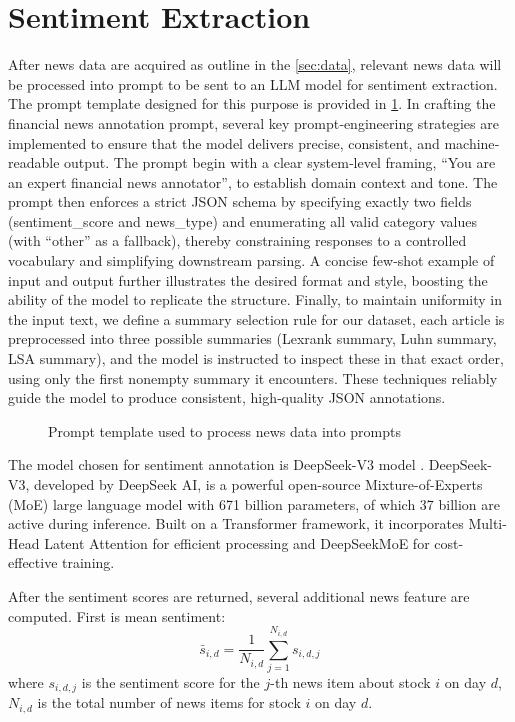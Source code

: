 \section{Sentiment Extraction}
After news data are acquired as outline in the \ref{sec:data}, relevant news data will be processed into prompt to be sent to an \gls{LLM} model for sentiment extraction. The prompt template designed for this purpose is provided in \ref{fig:prompt}. In crafting the financial news annotation prompt, several key prompt‐engineering strategies are implemented to ensure that the model delivers precise, consistent, and machine‐readable output. The prompt begin with a clear system‐level framing, “You are an expert financial news annotator”, to establish domain context and tone. The prompt then enforces a strict JSON schema by specifying exactly two fields (sentiment\_score and news\_type) and enumerating all valid category values (with “other” as a fallback), thereby constraining responses to a controlled vocabulary and simplifying downstream parsing. A concise few‐shot example of input and output further illustrates the desired format and style, boosting the ability of the model to replicate the structure. Finally, to maintain uniformity in the input text, we define a summary selection rule for our dataset, each article is preprocessed into three possible summaries (Lexrank summary, Luhn summary, \gls{LSA} summary), and the model is instructed to inspect these in that exact order, using only the first nonempty summary it encounters. These techniques reliably guide the model to produce consistent, high‐quality JSON annotations.

\begin{figure}
  \centering
  
  \caption{Prompt template used to process news data into prompts}
  \label{fig:prompt}
\end{figure}

The model chosen for sentiment annotation is DeepSeek-V3 model \cite{DeepSeekV3}. DeepSeek-V3, developed by DeepSeek AI, is a powerful open-source Mixture-of-Experts (MoE) large language model with 671 billion parameters, of which 37 billion are active during inference. Built on a Transformer framework, it incorporates Multi-Head Latent Attention for efficient processing and DeepSeekMoE for cost-effective training.

After the sentiment scores are returned, several additional news feature are computed. First is mean sentiment:
\[\bar{s}_{i,d}  = \frac{1}{N_{i,d}} \sum_{j=1}^{N_{i,d}} s_{i,d,j}\]
where \(s_{i,d,j}\) is the sentiment score for the \(j\)-th news item about stock \(i\) on day \(d\), \(N_{i,d}\) is the total number of news items for stock \(i\) on day \(d\).

